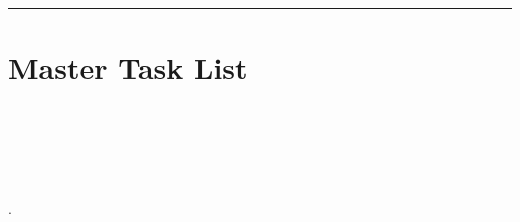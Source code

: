 \begin{landscape}
\begin{minipage}[t]{0.55\textwidth}
\hrule \bigskip

\begin{minipage}[t]{0.45\textwidth}

\end{minipage}\hfill 
\begin{minipage}[t]{0.45\textwidth}

\end{minipage}\hfill 
\bigskip

\end{minipage}\hfill 
\begin{minipage}[t]{0.7\textwidth}

\begin{minipage}[t]{0.62\textwidth}

\section{Master Task List}

\begin{minipage}[t]{0.47\textwidth}
\end{minipage}\hfill 
\begin{minipage}[t]{0.47\textwidth}
\end{minipage}

\end{minipage}\hfill
\vspace{2em}\begin{minipage}[t]{0.32\textwidth}
 \\[0.5em]
 \\[0.5em]

 \\[0.5em]
 \\[1.5em]

\end{minipage}\hfill
\smallskip


\begin{minipage}[t]{0.77\textwidth}

\eisenhower
\end{minipage}\hfill 
\begin{minipage}[t]{0.21\textwidth}
.
\end{minipage}
\end{minipage}
\end{landscape}




